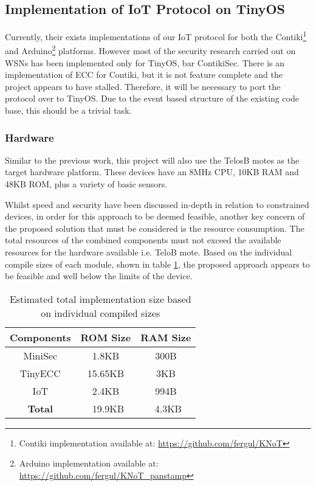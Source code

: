 \documentclass{mprop}
\begin{document}


\subsection{Implementation of IoT Protocol on TinyOS} %
\label{sub:implementation_of_iot_protocol_on_tinyos}
Currently, their exists implementations of our IoT protocol for both the Contiki\footnote{Contiki implementation available at: \url{https://github.com/fergul/KNoT}} and Arduino\footnote{Arduino implementation available at: \url{https://github.com/fergul/KNoT_panstamp}} platforms. However most of the security research carried out on WSNs has been implemented only for TinyOS, bar ContikiSec. There is an implementation of ECC for Contiki, but it is not feature complete and the project appears to have stalled\cite{ContikiECC}. Therefore, it will be necessary to port the protocol over to TinyOS. Due to the event based structure of the existing code base, this should be a trivial task.

\subsubsection{Hardware} %
\label{ssub:hardware}
Similar to the previous work\cite{KNoT}, this project will also use the TelosB motes as the target hardware platform. These devices have an 8MHz CPU, 10KB RAM and 48KB ROM, plus a variety of basic sensors.

Whilst speed and security have been discussed in-depth in relation to constrained devices, in order for this approach to be deemed feasible, another key concern of the proposed solution that must be considered is the resource consumption. The total resources of the combined components must not exceed the available resources for the hardware available i.e. TeloB mote. Based on the individual compile sizes of each module, shown in table \ref{tab:compile_sizes}, the proposed approach appears to be feasible and well below the limits of the device.
\begin{table}[h] %
  \begin{center} 
  \begin{tabular}{|c|c|c|} 
  \hline
  \textbf{Components} & \textbf{ROM Size}  & \textbf{RAM Size}\\  \hline
  MiniSec             & 1.8KB              & 300B \\     \hline
  TinyECC             & 15.65KB            & 3KB\\       \hline
  IoT                 & 2.4KB              & 994B\\      \hline 
  \textbf{Total}      & ~19.9KB            & ~4.3KB\\    \hline
  \end{tabular}
  \caption[]{Estimated total implementation size based on individual compiled sizes}
  \label{tab:compile_sizes}
  \end{center}
\end{table}
\end{document}

